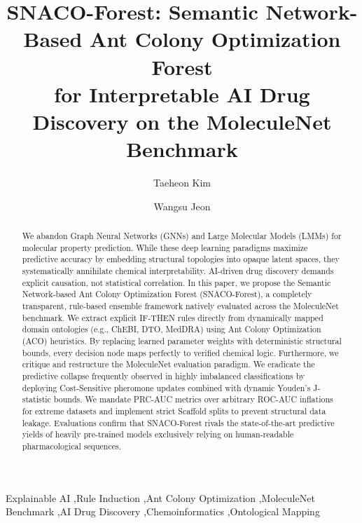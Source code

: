 \documentclass[preprint,12pt,authoryear]{elsarticle}
\begin{document}
\begin{frontmatter}

\title{SNACO-Forest: Semantic Network-Based Ant Colony Optimization Forest\\
for Interpretable AI Drug Discovery on the MoleculeNet Benchmark}

\author[First]{Taeheon Kim}

\author[Second]{Wangsu Jeon}


\address[First]{Department of Computer Science, Example University}
\address[Second]{Department of Bioinformatics, Example University}

\begin{abstract}
We abandon Graph Neural Networks (GNNs) and Large Molecular Models 
(LMMs) for molecular property prediction. While these deep learning paradigms 
maximize predictive accuracy by embedding structural topologies into opaque 
latent spaces, they systematically annihilate chemical interpretability. 
AI-driven drug discovery demands explicit causation, not statistical correlation. 
In this paper, we propose the Semantic Network-based Ant Colony Optimization Forest 
(SNACO-Forest), a completely transparent, rule-based ensemble framework 
natively evaluated across the MoleculeNet benchmark. 
We extract explicit IF-THEN rules directly from dynamically 
mapped domain ontologies (e.g., ChEBI, DTO, MedDRA) using 
Ant Colony Optimization (ACO) heuristics. 
By replacing learned parameter weights with deterministic 
structural bounds, every decision node maps perfectly to 
verified chemical logic. Furthermore, we critique and restructure the 
MoleculeNet evaluation paradigm. We eradicate the predictive collapse frequently observed in highly imbalanced classifications by deploying Cost-Sensitive pheromone updates combined with dynamic Youden's J-statistic bounds. We mandate PRC-AUC metrics over arbitrary ROC-AUC inflations for extreme datasets and implement strict Scaffold splits to prevent structural data leakage. Evaluations confirm that SNACO-Forest rivals the state-of-the-art predictive yields of heavily pre-trained models exclusively relying on human-readable pharmacological sequences.
\end{abstract}

\begin{keyword}
Explainable AI \sep Rule Induction \sep Ant Colony Optimization \sep MoleculeNet Benchmark \sep AI Drug Discovery \sep Chemoinformatics \sep Ontological Mapping
\end{keyword}

\end{frontmatter}
\end{document}
